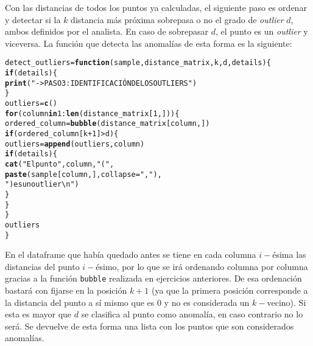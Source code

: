 \documentclass[12pt]{report}\usepackage[]{graphicx}\usepackage[dvipsnames]{xcolor}
\makeatletter
\newcommand{\hlnum}[1]{\textcolor[rgb]{0.686,0.059,0.569}{#1}}%
\newcommand{\hlstr}[1]{\textcolor[rgb]{0.192,0.494,0.8}{#1}}%
\newcommand{\hlopt}[1]{\textcolor[rgb]{0,0,0}{#1}}%
\newcommand{\hlstd}[1]{\textcolor[rgb]{0.345,0.345,0.345}{#1}}%
\newcommand{\hlkwa}[1]{\textcolor[rgb]{0.161,0.373,0.58}{\textbf{#1}}}%
\newcommand{\hlkwb}[1]{\textcolor[rgb]{0.69,0.353,0.396}{#1}}%
\newcommand{\hlkwc}[1]{\textcolor[rgb]{0.333,0.667,0.333}{#1}}%
\newcommand{\hlkwd}[1]{\textcolor[rgb]{0.737,0.353,0.396}{\textbf{#1}}}%
\newenvironment{kframe}{%
 \def\at@end@of@kframe{}%
 \ifinner\ifhmode%
  \def\at@end@of@kframe{\end{minipage}}%
  \begin{minipage}{\columnwidth}%
 \fi\fi%
 \def\FrameCommand##1{\hskip\@totalleftmargin \hskip-\fboxsep
 \colorbox{shadecolor}{##1}\hskip-\fboxsep
     \hskip-\linewidth \hskip-\@totalleftmargin \hskip\columnwidth}%
 \MakeFramed {\advance\hsize-\width
   \@totalleftmargin\z@ \linewidth\hsize
   \@setminipage}}%
 {\par\unskip\endMakeFramed%
 \at@end@of@kframe}
\newenvironment{knitrout}{}{} %
\makeatother
\begin{document}
					Con las distancias de todos los puntos ya calculadas, el siguiente paso es ordenar y detectar si la $k$ distancia más próxima sobrepasa o no el grado de \textit{outlier} $d$, ambos definidos por el analista. En caso de sobrepasar $d$, el punto es un \textit{outlier} y viceversa. La función que detecta las anomalías de esta forma es la siguiente:
					
\begin{knitrout}
\color{fgcolor}\begin{kframe}
\begin{alltt}
\hlstd{detect_outliers} \hlkwb{=} \hlkwa{function}\hlstd{(}\hlkwc{sample}\hlstd{,} \hlkwc{distance_matrix}\hlstd{,} \hlkwc{k}\hlstd{,} \hlkwc{d}\hlstd{,} \hlkwc{details}\hlstd{) \{}
        \hlkwa{if}\hlstd{(details) \{}
                \hlkwd{print}\hlstd{(}\hlstr{"->PASO 3: IDENTIFICACIÓN DE LOS OUTLIERS"}\hlstd{)}
        \hlstd{\}}
        \hlstd{outliers} \hlkwb{=} \hlkwd{c}\hlstd{()}
        \hlkwa{for} \hlstd{(column} \hlkwa{in} \hlnum{1}\hlopt{:}\hlkwd{len}\hlstd{(distance_matrix[}\hlnum{1}\hlstd{,])) \{}
                \hlstd{ordered_column} \hlkwb{=} \hlkwd{bubble}\hlstd{(distance_matrix[column,])}
                \hlkwa{if} \hlstd{(ordered_column[k}\hlopt{+}\hlnum{1}\hlstd{]} \hlopt{>} \hlstd{d) \{}
                        \hlstd{outliers} \hlkwb{=} \hlkwd{append}\hlstd{(outliers,column)}
                        \hlkwa{if}\hlstd{(details) \{}
                                \hlkwd{cat}\hlstd{(}\hlstr{"El punto"}\hlstd{, column,} \hlstr{"("}\hlstd{,}
                                \hlkwd{paste}\hlstd{(sample[column,],} \hlkwc{collapse} \hlstd{=} \hlstr{","}\hlstd{),}
                                \hlstr{") es un outlier\textbackslash{}n"}\hlstd{)}
                        \hlstd{\}}
                \hlstd{\}}
        \hlstd{\}}
        \hlstd{outliers}
\hlstd{\}}
\end{alltt}
\end{kframe}
\end{knitrout}
					
					En el dataframe que había quedado antes se tiene en cada columna $i-$ésima las distancias del punto $i-$ésimo, por lo que se irá ordenando columna por columna gracias a la función \texttt{bubble} realizada en ejercicios anteriores. De esa ordenación bastará con fijarse en la posición $k+1$ (ya que la primera posición corresponde a la distancia del punto a sí mismo que es 0 y no es considerada un $k-$vecino). Si esta es mayor que $d$ se clasifica al punto como anomalía, en caso contrario no lo será. Se devuelve de esta forma una lista con los puntos que son considerados anomalías.\\ 
					
\end{document}
